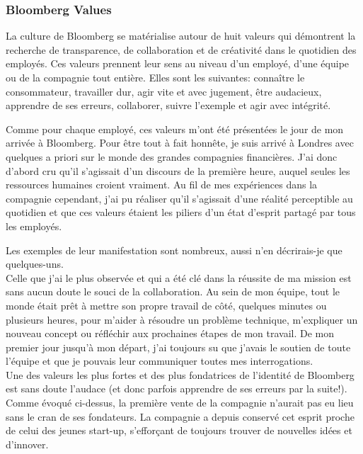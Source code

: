 \documentclass[11pt, oneside, titlepage, a4paper]{article}
\begin{document}
		\subsubsection{Bloomberg Values} \label{values}
La culture de Bloomberg se matérialise autour de huit valeurs qui démontrent la recherche de transparence, de collaboration et de créativité dans le quotidien des employés. Ces valeurs prennent leur sens au niveau d'un employé, d'une équipe ou de la compagnie tout entière. Elles sont les suivantes: connaître le consommateur, travailler dur, agir vite et avec jugement, être audacieux, apprendre de ses erreurs, collaborer, suivre l'exemple et agir avec intégrité.

Comme pour chaque employé, ces valeurs m'ont été présentées le jour de mon arrivée à Bloomberg. Pour être tout à fait honnête, je suis arrivé à Londres avec quelques a priori sur le monde des grandes compagnies financières. J'ai donc d'abord cru qu'il s'agissait d'un discours de la première heure, auquel seules les ressources humaines croient vraiment. Au fil de mes expériences dans la compagnie cependant, j'ai pu réaliser qu'il s'agissait d'une réalité perceptible au quotidien et que ces valeurs étaient les piliers d'un état d'esprit partagé par tous les employés.

Les exemples de leur manifestation sont nombreux, aussi n'en décrirais-je que quelques-uns.
\\

Celle que j'ai le plus observée et qui a été clé dans la réussite de ma mission est sans aucun doute le souci de la collaboration. Au sein de mon équipe, tout le monde était prêt à mettre son propre travail de côté, quelques minutes ou plusieurs heures, pour m'aider à résoudre un problème technique, m'expliquer un nouveau concept ou réfléchir aux prochaines étapes de mon travail. De mon premier jour jusqu'à mon départ, j'ai toujours su que j'avais le soutien de toute l'équipe et que je pouvais leur communiquer toutes mes interrogations.
\\

Une des valeurs les plus fortes et des plus fondatrices de l'identité de Bloomberg est sans doute l'audace (et donc parfois apprendre de ses erreurs par la suite!). Comme évoqué ci-dessus, la première vente de la compagnie n'aurait pas eu lieu sans le cran de ses fondateurs. La compagnie a depuis conservé cet esprit proche de celui des jeunes start-up, s'efforçant de toujours trouver de nouvelles idées et d'innover.
\\
\end{document}
